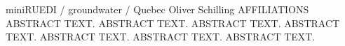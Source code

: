 \begin{conf-abstract}
{miniRUEDI / groundwater / Quebec}
{Oliver Schilling}
{AFFILIATIONS}
{ABSTRACT TEXT. ABSTRACT TEXT. ABSTRACT TEXT. ABSTRACT TEXT. ABSTRACT TEXT. ABSTRACT TEXT. ABSTRACT TEXT.}
\end{conf-abstract}
